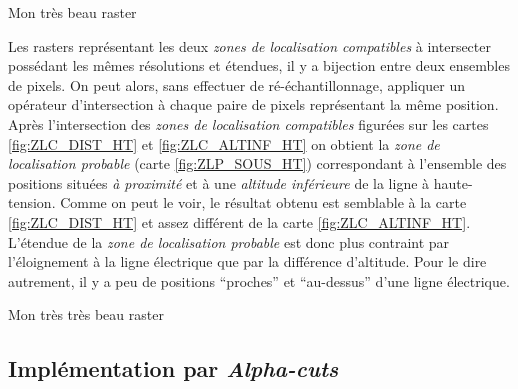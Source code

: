 \begin{carte}
  \centering
  
  \caption{Mon très beau raster}
  \label{fig:ZLC_ALTINF_HT}
\end{carte}

Les rasters représentant les deux \emph{zones de localisation
  compatibles} à intersecter possédant les mêmes résolutions et
étendues, il y a bijection entre deux ensembles de pixels. On peut
alors, sans effectuer de ré-échantillonnage, appliquer un opérateur
d'intersection à chaque paire de pixels représentant la même
position. Après l'intersection des \emph{zones de localisation
  compatibles} figurées sur les cartes \ref{fig:ZLC_DIST_HT} et
\ref{fig:ZLC_ALTINF_HT} on obtient la \emph{zone de localisation
  probable} (carte \ref{fig:ZLP_SOUS_HT}) correspondant à l'ensemble
des positions situées \emph{à proximité} et à une \emph{altitude
  inférieure} de la ligne à haute-tension. Comme on peut le voir, le
résultat obtenu est semblable à la carte \ref{fig:ZLC_DIST_HT} et
assez différent de la carte \ref{fig:ZLC_ALTINF_HT}. L'étendue de la
\emph{zone de localisation probable} est donc plus contraint par
l'éloignement à la ligne électrique que par la différence
d'altitude. Pour le dire autrement, il y a peu de positions
\enquote{proches} et \enquote{au-dessus} d'une ligne électrique.

\begin{carte}
  \centering
  
  \caption{Mon très très beau raster}
  \label{fig:ZLP_SOUS_HT}
\end{carte}


\subsection{Implémentation par \emph{Alpha-cuts}}

